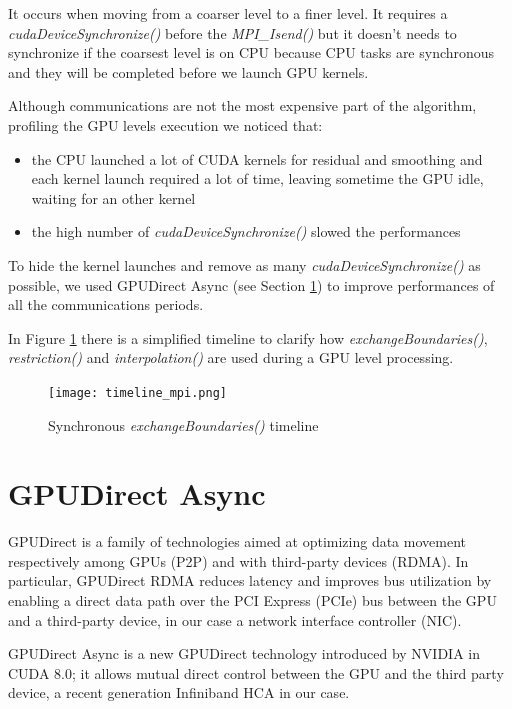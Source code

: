 \documentclass[conference]{IEEEtran}
\begin{document}
It occurs when moving from a coarser level to a finer level. It requires a \textit{cudaDeviceSynchronize()} before the \textit{MPI\_Isend()} but it doesn't needs to synchronize if the coarsest level is on CPU because CPU tasks are synchronous and they will be completed before we launch GPU kernels.

Although communications are not the most expensive part of the algorithm, profiling the GPU levels execution we noticed that:

\begin{itemize}
\item the CPU launched a lot of CUDA kernels for residual and smoothing and each kernel launch required a lot of time, leaving sometime the GPU idle, waiting for an other kernel
\item the high number of \textit{cudaDeviceSynchronize()} slowed the performances 
\end{itemize}

To hide the kernel launches and remove as many   \textit{cudaDeviceSynchronize()} as possible, we used GPUDirect Async (see Section \ref{sec:gpudirect_async}) to improve performances of all the communications periods.

In Figure \ref{fig:timeline_mpi} there is a simplified timeline to clarify how \textit{exchangeBoundaries()}, \textit{restriction()} and \textit{interpolation()} are used during a GPU level processing.

\begin{figure}[h]
\centering
\texttt{[image: timeline\_mpi.png]}
\caption{Synchronous \textit{exchangeBoundaries()} timeline}
\label{fig:timeline_mpi}
\end{figure}

\section{GPUDirect Async}\label{sec:gpudirect_async}

GPUDirect \cite{GPUDirect} is a family of technologies aimed at optimizing data movement respectively among GPUs (P2P) and with third-party devices (RDMA). In particular, GPUDirect RDMA reduces latency and improves bus utilization by enabling a direct data path over the PCI Express (PCIe) bus between the GPU and a third-party device, in our case a network interface controller (NIC).

GPUDirect Async is a new GPUDirect technology introduced by NVIDIA in CUDA 8.0; it allows mutual direct control between the GPU and the third party device, a recent generation Infiniband HCA in our case.
\end{document}
